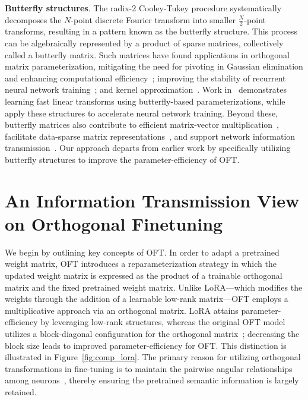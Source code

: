 \textbf{Butterfly structures}. The radix-2 Cooley-Tukey procedure systematically decomposes the $N$-point discrete Fourier transform into smaller $\frac{N}{2}$-point transforms, resulting in a pattern known as the butterfly structure. This process can be algebraically represented by a product of sparse matrices, collectively called a butterfly matrix. Such matrices have found applications in orthogonal matrix parameterization, mitigating the need for pivoting in Gaussian elimination and enhancing computational efficiency~\cite{parker1995random}; improving the stability of recurrent neural network training~\cite{jing2017tunable}; and kernel approximation~\cite{munkhoeva2018quadrature}. Work in~\cite{dao2019learning,dao2019kaleidoscope} demonstrates learning fast linear transforms using butterfly-based parameterizations, while~\cite{chen2022pixelated,dao2022monarch} apply these structures to accelerate neural network training. Beyond these, butterfly matrices also contribute to efficient matrix-vector multiplication~\cite{michielssen1996multilevel,o2010algorithm}, facilitate data-sparse matrix representations~\cite{li2015butterfly}, and support network information transmission~\cite{klasing1994broadcasting,li2003linear,rajasingh2016transmission}. Our approach departs from earlier work by specifically utilizing butterfly structures to improve the parameter-efficiency of OFT.

\section{An Information Transmission View on Orthogonal Finetuning}

We begin by outlining key concepts of OFT. In order to adapt a pretrained weight matrix, OFT introduces a reparameterization strategy in which the updated weight matrix is expressed as the product of a trainable orthogonal matrix and the fixed pretrained weight matrix. Unlike LoRA—which modifies the weights through the addition of a learnable low-rank matrix—OFT employs a multiplicative approach via an orthogonal matrix. LoRA attains parameter-efficiency by leveraging low-rank structures, whereas the original OFT model utilizes a block-diagonal configuration for the orthogonal matrix~\cite{qiu2023controlling}; decreasing the block size leads to improved parameter-efficiency for OFT. This distinction is illustrated in Figure~\ref{fig:comp_lora}. The primary reason for utilizing orthogonal transformations in fine-tuning is to maintain the pairwise angular relationships among neurons~\cite{liu2018learning,liu2021orthogonal,qiu2023controlling}, thereby ensuring the pretrained semantic information is largely retained. 

